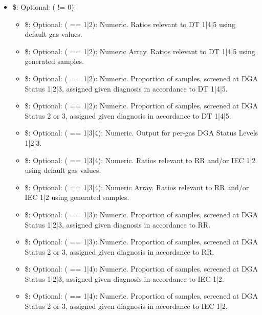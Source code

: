 \documentclass[a4paper]{book}
\begin{document}
\begin{Value}
\begin{itemize}
\begin{itemize}
\end{itemize}

\item{} \$: Optional: ( != 0):
\begin{itemize}

\item{} \$: Optional: ( == 1|2): Numeric. Ratios relevant to DT 1|4|5 using default gas values.
\item{} \$: Optional: ( == 1|2): Numeric Array. Ratios relevant to DT 1|4|5 using generated samples.
\item{} \$: Optional: ( == 1|2): Numeric. Proportion of samples, screened at DGA Status 1|2|3, assigned given diagnosis in accordance to DT 1|4|5.
\item{} \$: Optional: ( == 1|2): Numeric. Proportion of samples, screened at DGA Status 2 or 3, assigned given diagnosis in accordance to DT 1|4|5.
\item{} \$: Optional: ( == 1|3|4): Numeric. Output for per-gas DGA Status Levels 1|2|3.
\item{} \$: Optional: ( == 1|3|4): Numeric. Ratios relevant to RR and/or IEC 1|2 using default gas values.
\item{} \$: Optional: ( == 1|3|4): Numeric Array. Ratios relevant to RR and/or IEC 1|2 using generated samples.
\item{} \$: Optional: ( == 1|3): Numeric. Proportion of samples, screened at DGA Status 1|2|3, assigned given diagnosis in accordance to RR.
\item{} \$: Optional: ( == 1|3): Numeric. Proportion of samples, screened at DGA Status 2 or 3, assigned given diagnosis in accordance to RR.
\item{} \$: Optional: ( == 1|4): Numeric. Proportion of samples, screened at DGA Status 1|2|3, assigned given diagnosis in accordance to IEC 1|2.
\item{} \$: Optional: ( == 1|4): Numeric. Proportion of samples, screened at DGA Status 2 or 3, assigned given diagnosis in accordance to IEC 1|2.

\end{itemize}


\end{itemize}

\end{Value}
\end{document}
